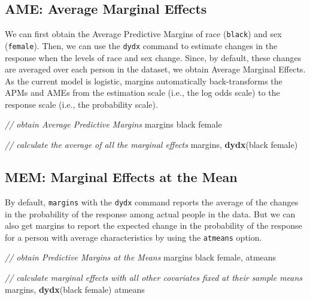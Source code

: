 \documentclass[
]{book}
\newenvironment{Shaded}{\begin{snugshade}}{\end{snugshade}}
\newcommand{\BaseNTok}[1]{\textcolor[rgb]{0.00,0.00,0.81}{#1}}
\newcommand{\CommentTok}[1]{\textcolor[rgb]{0.56,0.35,0.01}{\textit{#1}}}
\newcommand{\KeywordTok}[1]{\textcolor[rgb]{0.13,0.29,0.53}{\textbf{#1}}}
\newcommand{\NormalTok}[1]{#1}
\begin{document}
\hypertarget{ame-average-marginal-effects}{%
\subsection{AME: Average Marginal Effects}\label{ame-average-marginal-effects}}

We can first obtain the Average Predictive Margins of race (\texttt{black}) and sex (\texttt{female}). Then, we can use the \texttt{dydx} command to estimate changes in the response when the levels of race and sex change. Since, by default, these changes are averaged over each person in the dataset, we obtain Average Marginal Effects. As the current model is logistic, margins automatically back-transforms the APMs and AMEs from the estimation scale (i.e., the log odds scale) to the response scale (i.e., the probability scale).

\begin{Shaded}
\begin{Highlighting}[]
\CommentTok{// obtain Average Predictive Margins }
\NormalTok{margins }\BaseNTok{black}\NormalTok{ female }

\CommentTok{// calculate the average of all the marginal effects }
\NormalTok{margins, }\KeywordTok{dydx}\NormalTok{(}\BaseNTok{black}\NormalTok{ female)}
\end{Highlighting}
\end{Shaded}

\hypertarget{mem-marginal-effects-at-the-mean}{%
\subsection{MEM: Marginal Effects at the Mean}\label{mem-marginal-effects-at-the-mean}}

By default, \texttt{margins} with the \texttt{dydx} command reports the average of the changes in the probability of the response among actual people in the data. But we can also get margins to report the expected change in the probability of the response for a person with average characteristics by using the \texttt{atmeans} option.

\begin{Shaded}
\begin{Highlighting}[]
\CommentTok{// obtain Predictive Margins at the Means}
\NormalTok{margins }\BaseNTok{black}\NormalTok{ female, atmeans}

\CommentTok{// calculate marginal effects with all other covariates fixed at their sample means }
\NormalTok{margins, }\KeywordTok{dydx}\NormalTok{(}\BaseNTok{black}\NormalTok{ female) atmeans}
\end{Highlighting}
\end{Shaded}
\end{document}
